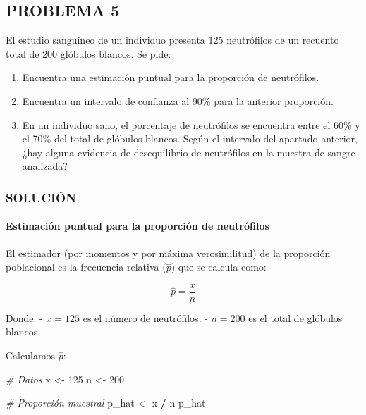 \documentclass[
]{article}
\newenvironment{Shaded}{\begin{snugshade}}{\end{snugshade}}
\newcommand{\CommentTok}[1]{\textcolor[rgb]{0.56,0.35,0.01}{\textit{#1}}}
\newcommand{\DecValTok}[1]{\textcolor[rgb]{0.00,0.00,0.81}{#1}}
\newcommand{\NormalTok}[1]{#1}
\newcommand{\OtherTok}[1]{\textcolor[rgb]{0.56,0.35,0.01}{#1}}
\newcommand{\SpecialCharTok}[1]{\textcolor[rgb]{0.81,0.36,0.00}{\textbf{#1}}}
\providecommand{\tightlist}{%
  \setlength{\itemsep}{0pt}\setlength{\parskip}{0pt}}
\begin{document}
\subsection{PROBLEMA 5}\label{problema-5-1}

El estudio sanguíneo de un individuo presenta 125 neutrófilos de un recuento total de 200 glóbulos blancos. Se pide:

\begin{enumerate}
\def\labelenumi{\arabic{enumi}.}
\tightlist
\item
  Encuentra una estimación puntual para la proporción de neutrófilos.\\
\item
  Encuentra un intervalo de confianza al 90\% para la anterior proporción.\\
\item
  En un individuo sano, el porcentaje de neutrófilos se encuentra entre el 60\% y el 70\% del total de glóbulos blancos. Según el intervalo del apartado anterior, ¿hay alguna evidencia de desequilibrio de neutrófilos en la muestra de sangre analizada?
\end{enumerate}

\subsubsection{SOLUCIÓN}\label{soluciuxf3n-19}

\paragraph{Estimación puntual para la proporción de neutrófilos}\label{estimaciuxf3n-puntual-para-la-proporciuxf3n-de-neutruxf3filos}

El estimador (por momentos y por máxima verosimilitud) de la proporción poblacional es la frecuencia relativa (\(\hat{p}\)) que se calcula como:

\[ \hat{p} = \frac{x}{n} \]

Donde:
- \(x = 125\) es el número de neutrófilos.
- \(n = 200\) es el total de glóbulos blancos.

Calculamos \(\hat{p}\):

\begin{Shaded}
\begin{Highlighting}[]
\CommentTok{\# Datos}
\NormalTok{x }\OtherTok{\textless{}{-}} \DecValTok{125}
\NormalTok{n }\OtherTok{\textless{}{-}} \DecValTok{200}

\CommentTok{\# Proporción muestral}
\NormalTok{p\_hat }\OtherTok{\textless{}{-}}\NormalTok{ x }\SpecialCharTok{/}\NormalTok{ n}
\NormalTok{p\_hat}
\end{Highlighting}
\end{Shaded}
\end{document}
